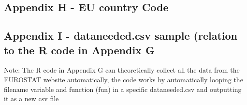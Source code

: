\documentclass[12pt]{article}
\begin{document}
\newpage


\subsection{Appendix H - EU country Code}


\newpage
\subsection{Appendix I - dataneeded.csv sample (relation to the R code in Appendix G}
Note: The R code in Appendix G can theoretically collect all the data from the EUROSTAT website automatically, the code works by automatically looping the filename variable and function (fun) in a specific dataneeded.csv and outputting it as a new csv file





\newpage
\end{document}
